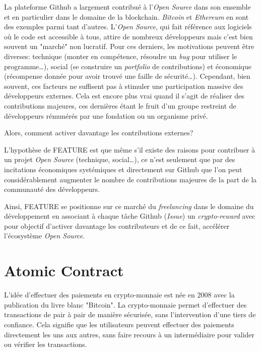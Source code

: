 \documentclass[
	a4paper, %
	10pt, %
	unnumberedsections, %
	twoside, %
]{LTJournalArticle}
\begin{document}
La plateforme Github a largement contribué à l'\emph{Open Source} dans son ensemble et en particulier dans le domaine de la blockchain. \emph{Bitcoin} et \emph{Ethereum} en sont des exemples parmi tant d'autres. L'\emph{Open Source}, qui fait référence aux logiciels où le code est accessible à tous, attire de nombreux développeurs mais c'est bien souvent un "marché" non lucratif. Pour ces derniers, les motivations peuvent être diverses: technique (monter en compétence, résoudre un \emph{bug} pour utiliser le programme\ldots), social (se construire un \emph{portfolio} de contributions) et économique (récompense donnée pour avoir trouvé une faille de sécurité\ldots). Cependant, bien souvent, ces facteurs ne suffisent pas à stimuler une participation massive des développeurs externes. Cela est encore plus vrai quand il s'agit de réaliser des contributions majeures, ces dernières étant le fruit d'un groupe restreint de développeurs rémunérés par une fondation
ou un organisme privé.

Alors, comment activer davantage les contributions externes?

L'hypothèse de FEATURE est que même s'il existe des raisons pour contribuer à un projet \emph{Open Source} (technique, social\ldots), ce n'est seulement que par des incitations économiques systémiques et directement sur Github que l'on peut considérablement augmenter le nombre de contributions majeures de la part de la communauté des développeurs.

Ainsi, FEATURE se positionne sur ce marché du \emph{freelancing} dans le domaine du développement en associant à chaque tâche Github (\emph{Issue}) un \emph{crypto-reward} avec pour objectif d'activer davantage les contributeurs et de ce fait, accélérer l'écosystème \emph{Open Source}.


\section{Atomic Contract}

L'idée d'effectuer des paiements en crypto-monnaie est née en 2008 avec la publication du livre blanc "Bitcoin". La crypto-monnaie permet d'effectuer des transactions de pair à pair de manière sécurisée, sans l'intervention d'une tiers de confiance. Cela signifie que les utilisateurs peuvent effectuer des paiements directement les uns aux autres, sans faire recours à un intermédiaire pour valider ou vérifier les transactions.
\end{document}
